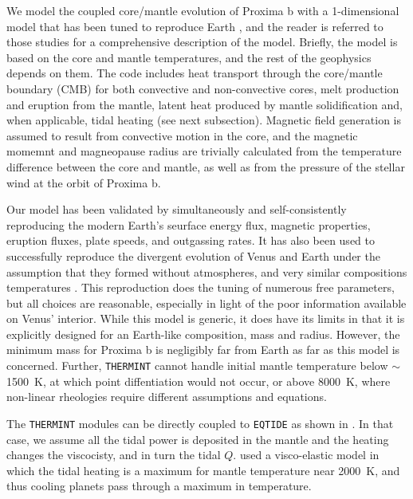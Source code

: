 \documentclass[preprint,12pt]{aastex}
\def\eqtide{\texttt{\footnotesize{EQTIDE}}\xspace}
\def\thermint{\texttt{\footnotesize{THERMINT}}\xspace}
\begin{document}
We model the coupled core/mantle evolution of Proxima b with a
1-dimensional model that has been tuned to reproduce Earth
\citep{DriscollOlson11,DriscollBercovici13,DriscollBercovici14,DriscollBarnes15}, and the
reader is referred to those studies for a comprehensive description of
the model. Briefly, the model is based on the core and mantle
temperatures, and the rest of the geophysics depends on them. The code
includes heat transport through the core/mantle boundary (CMB) for
both convective and non-convective cores, melt production and eruption
from the mantle, latent heat produced by mantle solidification and,
when applicable, tidal heating (see next subsection). Magnetic field
generation is assumed to result from convective motion in the core,
and the magnetic momemnt and magneopause radius are trivially
calculated from the temperature difference between the core and
mantle, as well as from the pressure of the stellar wind at the orbit
of Proxima b.

Our model has been validated by simultaneously and self-consistently
reproducing the modern Earth's seurface energy flux, magnetic
properties, eruption fluxes, plate speeds, and outgassing rates. It
has also been used to successfully reproduce the divergent evolution
of Venus and Earth under the assumption that they formed without
atmospheres, and very similar compositions temperatures
\citep{DriscollBercovici13}. This reproduction does the tuning of
numerous free parameters, but all choices are reasonable, especially
in light of the poor information available on Venus' interior. While
this model is generic, it does have its limits in that it is
explicitly designed for an Earth-like composition, mass and
radius. However, the minimum mass for Proxima b is negligibly far from
Earth as far as this model is concerned. Further, \thermint cannot
handle initial mantle temperature below $\sim$1500~K, at which point
diffentiation would not occur, or above 8000~K, where non-linear
rheologies require different assumptions and equations.

The \thermint modules can be directly coupled to \eqtide as shown in
\citep{DriscollBarnes15}. In that case, we assume all the tidal power
is deposited in the mantle and the heating changes the viscocisty, and
in turn the tidal $Q$. \cite{DriscollBarnes15} used a visco-elastic
model in which the tidal heating is a maximum for mantle temperature
near 2000~K, and thus cooling planets pass through a maximum in
temperature.
\end{document}
